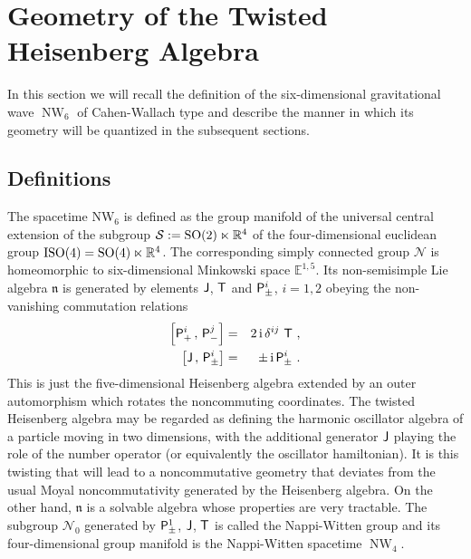 \documentclass[11pt,a4paper]{article}
\DeclareMathOperator{\NW}{NW}
\def\nn{\nonumber}
\newcommand{\1}{\mathbb{1}}
\def\ii{{\,{\rm i}\,}}
\def\P{{\sf P}}
\def\T{{\sf T}}
\def\J{{\sf J}}
\newcommand{\newsection}{\setcounter{equation}{0}\section}
\newcommand{\real}{{\mathbb R}} %
\newcommand{\eucl}{{\mathbb E}}
\def\nn{\nonumber}
\def\bea{\begin{eqnarray}}
\def\eea{\end{eqnarray}}
\begin{document}
\newsection{Geometry of the Twisted Heisenberg Algebra\label{TTHA}}

In this section we will recall the definition of the six-dimensional
gravitational wave $\NW_6$ of Cahen-Wallach type and describe the
manner in which its geometry will be quantized in the subsequent
sections.

\subsection{Definitions \label{Defs}}

The spacetime NW$_6$ is defined as the group manifold of
the universal central extension of the subgroup
$\mathcal{S}:={\rm SO}(2)\ltimes\real^4$ of the four-dimensional
euclidean group ${\rm ISO}(4)={\rm
  SO}(4)\ltimes\real^4$. The corresponding simply connected group
$\mathcal N$ is homeomorphic to six-dimensional Minkowski space
$\eucl^{1,5}$. Its non-semisimple Lie algebra $\mathfrak n$ is
generated by elements $\J$, $\T$ and $\P^i_\pm$, $i=1,2$ obeying the
non-vanishing commutation relations
\bea
\left[\P^i_+\,,\,\P^j_-\right]&=&2\ii\delta^{ij}~\T \ , \nn\\
\left[\J\,,\,\P^i_\pm\right]&=&\pm\ii\P^i_\pm \ .
\label{NW4algdef}\eea
This is just the five-dimensional Heisenberg algebra extended by an
outer automorphism which rotates the noncommuting coordinates. The
twisted Heisenberg algebra
may be regarded as defining the harmonic oscillator algebra of a
particle moving in two dimensions, with the additional generator $\J$
playing the role of the number operator (or equivalently the
oscillator hamiltonian). It is this twisting that will
lead to a noncommutative geometry that deviates from the usual Moyal
noncommutativity generated by the Heisenberg algebra. On the other
hand, $\mathfrak{n}$ is a solvable algebra whose properties are very
tractable. The subgroup $\mathcal{N}_0$ generated by $\P^1_\pm$, $\J$,
$\T$ is called the Nappi-Witten group and its four-dimensional group
manifold is the Nappi-Witten spacetime $\NW_4$.
\end{document}
